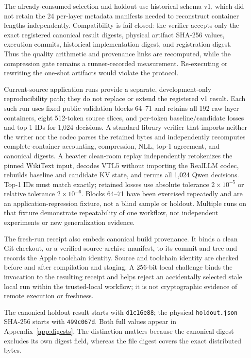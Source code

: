 \documentclass[10pt,twocolumn]{article}
\begin{document}
The already-consumed selection and holdout use historical schema v1, which did
not retain the 24 per-layer metadata manifests needed to reconstruct container
lengths independently. Compatibility is fail-closed: the verifier accepts only
the exact registered canonical result digests, physical artifact SHA-256 values,
execution commits, historical implementation digest, and registration digest.
Thus the quality arithmetic and provenance links are recomputed, while the
compression gate remains a runner-recorded measurement. Re-executing or
rewriting the one-shot artifacts would violate the protocol.

Current-source application runs provide a separate, development-only
reproducibility path; they do not replace or extend the registered v1 result.
Each such run uses fixed public validation blocks 64--71 and retains all 192 raw
layer containers, eight 512-token source slices, and per-token
baseline/candidate losses and top-1 IDs for 1,024 decisions. A standard-library
verifier that imports neither the writer nor the codec parses the retained
bytes and independently recomputes complete-container accounting, compression,
NLL, top-1 agreement, and canonical digests. A heavier clean-room replay
independently retokenizes the pinned WikiText input, decodes VTL5 without
importing the RealLLM codec, rebuilds baseline and candidate KV state, and
reruns all 1,024 Qwen decisions. Top-1 IDs must match exactly; retained losses
use absolute tolerance $2\times10^{-5}$ or relative tolerance
$2\times10^{-6}$. Blocks 64--71 have been exercised repeatedly and are an
application-regression fixture, not a blind sample or holdout. Multiple runs on
that fixture demonstrate repeatability of one workflow, not independent
experiments or new generalization evidence.

The fresh-run receipt also embeds canonical build provenance. It binds a clean
Git checkout, or a verified source-archive manifest, to its commit and tree and
records the Apple toolchain identity. Source and toolchain identity are checked
before and after compilation and staging. A 256-bit local challenge binds the
invocation to the resulting receipt and helps reject an accidentally selected
stale local run within the trusted-local workflow; it is not cryptographic
evidence of remote execution or freshness.

The canonical holdout result starts with \texttt{d1c16e88}; the physical
\texttt{holdout.json} SHA-256 starts with \texttt{499c067d}. Both full values
appear in Appendix~\ref{app:digests}. The distinction matters because the
canonical digest excludes its own digest field, whereas the file digest covers
the exact distributed bytes.
\end{document}
